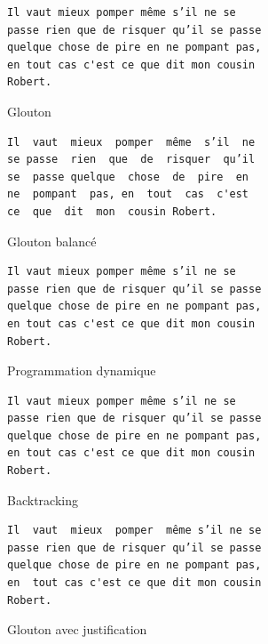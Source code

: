 \documentclass[a4paper, 11pt]{article}
\begin{document}
\begin{figure}[!h]
\begin{verbatim}
Il vaut mieux pomper même s’il ne se
passe rien que de risquer qu’il se passe
quelque chose de pire en ne pompant pas,
en tout cas c'est ce que dit mon cousin
Robert.
\end{verbatim}
\caption{Glouton}
\end{figure}

\begin{figure}[!h]
\begin{verbatim}
Il  vaut  mieux  pomper  même  s’il  ne
se passe  rien  que  de  risquer  qu’il
se  passe quelque  chose  de  pire  en
ne  pompant  pas, en  tout  cas  c'est
ce  que  dit  mon  cousin Robert.
\end{verbatim}
\caption{Glouton balancé}
\end{figure}

\begin{figure}[!h]
\begin{verbatim}
Il vaut mieux pomper même s’il ne se
passe rien que de risquer qu’il se passe
quelque chose de pire en ne pompant pas,
en tout cas c'est ce que dit mon cousin
Robert.
\end{verbatim}
\caption{Programmation dynamique}
\end{figure}

\begin{figure}[!h]
\begin{verbatim}
Il vaut mieux pomper même s’il ne se
passe rien que de risquer qu’il se passe
quelque chose de pire en ne pompant pas,
en tout cas c'est ce que dit mon cousin
Robert.
\end{verbatim}
\caption{Backtracking}
\end{figure}

\begin{figure}[!h]
\begin{verbatim}
Il  vaut  mieux  pomper  même s’il ne se
passe rien que de risquer qu’il se passe
quelque chose de pire en ne pompant pas,
en  tout cas c'est ce que dit mon cousin
Robert.
\end{verbatim}
\caption{Glouton avec justification}
\end{figure}

\newpage


\end{document}
